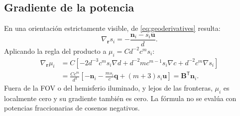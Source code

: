 \documentclass[11pt,a4paper]{article}
\begin{document}
\subsection{Gradiente de la potencia}
En una orientación estrictamente visible, de \eqref{eq:geoderivatives} resulta:
\begin{equation}
\nabla_{\mathbf r}s_i=-\frac{\mathbf n_i-s_i\mathbf u}{d}.
\label{eq:ds}
\end{equation}
Aplicando la regla del producto a $\mu_i=C d^{-2}c^m s_i$:
\begin{align}
\nabla_{\mathbf r}\mu_i
&=C\left[-2d^{-3}c^m s_i\nabla d+d^{-2}mc^{m-1}s_i\nabla c+d^{-2}c^m\nabla s_i\right]\label{eq:product}\\
&=\frac{C c^m}{d^3}\left[-\mathbf n_i-\frac{m s_i}{c}\mathbf q+(m+3)s_i\mathbf u\right]
=\mathbf B^{\mathsf T}\mathbf n_i.
\label{eq:gradient}
\end{align}
Fuera de la FOV o del hemisferio iluminado, y lejos de las fronteras, $\mu_i$ es localmente cero y su gradiente también es cero. La fórmula no se evalúa con potencias fraccionarias de cosenos negativos.
\end{document}
